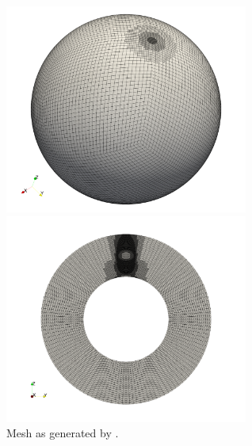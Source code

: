 \begin{center}
\includegraphics[width=8cm]{python_codes/fieldstone_152/results/exp2_axisymmetric/aspect/mesh}
\includegraphics[width=8cm]{python_codes/fieldstone_152/results/exp2_axisymmetric/aspect/mesh2}\\
{\captionfont Mesh as generated by \aspect.}
\end{center}

